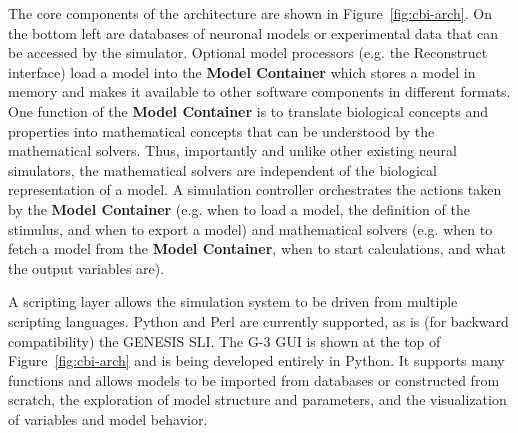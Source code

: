 \documentclass[10pt]{article}
\begin{document}
The core components of the architecture are shown in
Figure~\ref{fig:cbi-arch}. On the bottom left are
databases of neuronal models or experimental data that can be accessed
by the simulator. Optional model processors (e.g. the Reconstruct
interface) load a model into the {\bf Model Container} which stores a
model in memory and makes it available to other software components in
different formats.  One function of the {\bf Model Container} is to
translate biological concepts and properties into mathematical
concepts that can be understood by the mathematical solvers. Thus,
importantly and unlike other existing neural simulators, the
mathematical solvers are independent of the biological representation
of a model. A simulation controller orchestrates the actions taken by
the {\bf Model Container} (e.g. when to load a model, the definition
of the stimulus, and when to export a model) and mathematical solvers
(e.g. when to fetch a model from the {\bf Model Container}, when to
start
calculations, and what the output variables are).


A scripting layer allows the simulation system to be driven from
multiple scripting languages. Python and Perl are currently supported,
as is (for backward compatibility) the GENESIS SLI. The G-3 GUI is shown at the top of
Figure~\ref{fig:cbi-arch} and is being developed entirely in Python.  It supports many functions and
allows models to be imported from databases or constructed from
scratch, the exploration of model structure and parameters, and the
visualization of variables and model behavior.
\end{document}
